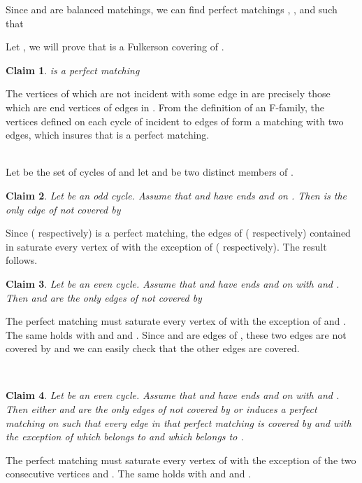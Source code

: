 \documentclass{amsart}
\newtheorem{Clm}{Claim}[thm]
\theoremstyle{definition}
\theoremstyle{remark}
\newenvironment{prf}{{\bf \noindent Proof } }{\hfill\\}
\newenvironment{PrfClaim}{{\bf Proof }}{{\hfill\tiny{\\}}}
\begin{document}
\begin{prf} Since  and  are balanced matchings, we can
find  perfect matchings , ,  and 
such that


Let , we will prove that
 is a Fulkerson
covering of .



\begin{Clm}\label{Claim:NperfectMatching}
 is a perfect matching
\end{Clm}
\begin{PrfClaim}
The vertices of  which are not incident with some edge in  are precisely those which are end vertices of
edges in . From the definition of an  F-family, the 
vertices defined on each cycle of 
incident to edges of  form a matching with two edges,
which insures that  is a perfect matching.

\end{PrfClaim}
Let  be the set of cycles
of  and let  and  be two distinct members of
.
\begin{Clm}\label{Claim:OddCycles}
Let  be an odd cycle. Assume that  and 
have ends  and  on . Then   is the only edge of
 not covered by 
\end{Clm}
\begin{PrfClaim}
Since  ( respectively) is a perfect matching, the
edges of  ( respectively) contained in 
saturate every vertex of  with the exception of  (
respectively). The result follows.
\end{PrfClaim}


\begin{Clm}\label{Claim:EvenCyclesFirst}
Let  be an even cycle. Assume that  and
 have ends  and  on  with
 and . Then  and
 are the only edges of  not covered by 
\end{Clm}
\begin{PrfClaim} The perfect matching  must saturate every vertex of
 with the
exception of  and . The same holds with  and
 and . Since  and  are edges of
, these two edges are not covered by  and we
can easily check that the other edges are covered.

\end{PrfClaim}

\begin{Clm}\label{Claim:EvenCyclesSecond}
Let  be an even cycle. Assume that  and
 have ends  and  on  with
 and . Then either 
and  are the only edges of  not covered by
 or  induces a perfect matching
on  such that every edge in that perfect matching is covered
by  and  with the exception of  which
belongs to  and  which belongs to .
\end{Clm}
\begin{PrfClaim}The perfect matching  must saturate every vertex of
 with the
exception of the two consecutive vertices  and . The
same holds with  and  and .



\end{PrfClaim}
\end{prf}
\end{document}
